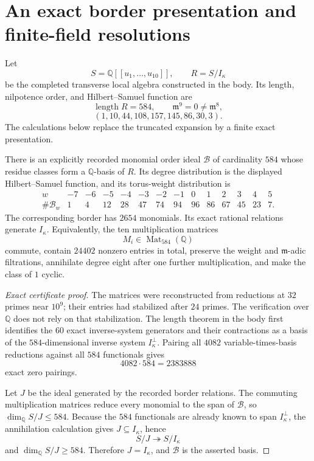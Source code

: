 \section{An exact border presentation and finite-field resolutions}
\label{app:border-basis}

Let
\[
S=\mathbb Q[[u_1,\ldots,u_{10}]],\qquad R=S/I_\kappa
\]
be the completed transverse local algebra constructed in the body.  Its
length, nilpotence order, and Hilbert--Samuel function are
\[
\operatorname{length}R=584,\qquad
\mathfrak m^9=0\ne\mathfrak m^8,
\]
\[
(1,10,44,108,157,145,86,30,3).
\]
The calculations below replace the truncated expansion by a finite exact
presentation.

\begin{theorem}
\label{thm:exact-border-basis}
There is an explicitly recorded monomial order ideal
\(\mathcal B\) of cardinality \(584\) whose residue classes form a
\(\mathbb Q\)-basis of \(R\).  Its degree distribution is the displayed
Hilbert--Samuel function, and its torus-weight distribution is
\[
\begin{array}{c|rrrrrrrrrrrrr}
w&-7&-6&-5&-4&-3&-2&-1&0&1&2&3&4&5\\ \hline
\#\mathcal B_w&1&4&12&28&47&74&94&96&86&67&45&23&7.
\end{array}
\]
The corresponding border has \(2654\) monomials.  Its exact rational
relations generate \(I_\kappa\).  Equivalently, the ten multiplication
matrices
\[
M_i\in\operatorname{Mat}_{584}(\mathbb Q)
\]
commute, contain \(24402\) nonzero entries in total, preserve the weight and
\(\mathfrak m\)-adic filtrations, annihilate degree eight after one further
multiplication, and make the class of \(1\) cyclic.
\end{theorem}

\begin{proof}[Exact certificate proof]
The matrices were reconstructed from reductions at \(32\) primes near
\(10^9\); their entries had stabilized after \(24\) primes.  The
verification over \(\mathbb Q\) does not rely on that stabilization.
The length theorem in the body first identifies the \(60\) exact
inverse-system generators and their contractions as a basis of the
\(584\)-dimensional inverse system \(I_\kappa^\perp\).  Pairing all \(4082\)
variable-times-basis reductions against all \(584\) functionals gives
\[
4082\cdot584=2383888
\]
exact zero pairings.

Let \(J\) be the ideal generated by the recorded border relations.  The
commuting multiplication matrices reduce every monomial to the span of
\(\mathcal B\), so
\(\dim_\mathbb Q S/J\le584\).  Because the \(584\) functionals are already
known to span \(I_\kappa^\perp\), the annihilation calculation gives
\(J\subseteq I_\kappa\), hence
\[
S/J\twoheadrightarrow S/I_\kappa
\]
and \(\dim_\mathbb Q S/J\ge584\).  Therefore \(J=I_\kappa\), and
\(\mathcal B\) is the asserted basis.
\end{proof}

